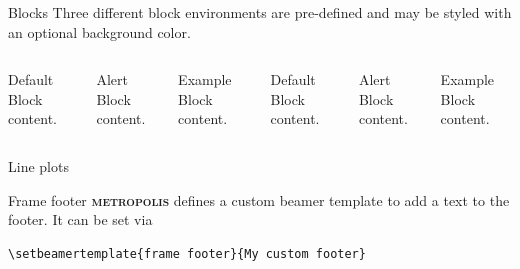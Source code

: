 \documentclass[10pt,dvipsnames]{beamer}
\newcommand{\themename}{\textbf{\textsc{metropolis}}\xspace}
\begin{document}
\begin{frame}{Blocks}
  Three different block environments are pre-defined and may be styled with an
  optional background color.

  \begin{columns}[T,onlytextwidth]
      \begin{block}{Default}
        Block content.
      \end{block}

      \begin{alertblock}{Alert}
        Block content.
      \end{alertblock}

      \begin{exampleblock}{Example}
        Block content.
      \end{exampleblock}



      \begin{block}{Default}
        Block content.
      \end{block}

      \begin{alertblock}{Alert}
        Block content.
      \end{alertblock}

      \begin{exampleblock}{Example}
        Block content.
      \end{exampleblock}

  \end{columns}
\end{frame}

\begin{frame}{Line plots}
  \begin{figure}
  \end{figure}
\end{frame}

{%
\begin{frame}[fragile]{Frame footer}
    \themename defines a custom beamer template to add a text to the footer. It can be set via
    \begin{verbatim}\setbeamertemplate{frame footer}{My custom footer}\end{verbatim}
\end{frame}
}
\end{document}
